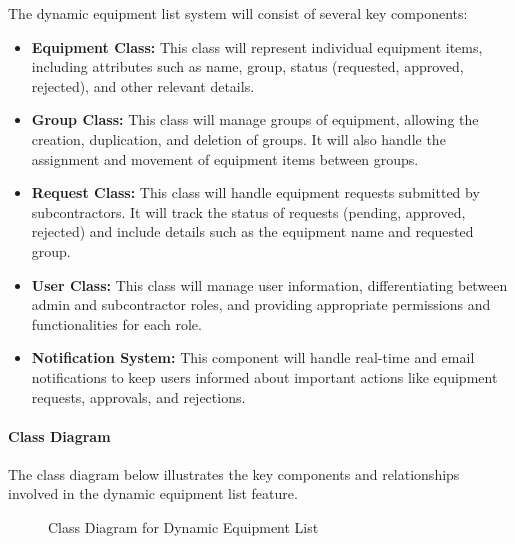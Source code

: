 The dynamic equipment list system will consist of several key components:

\begin{itemize}
    \item \textbf{Equipment Class:} This class will represent individual equipment items, including attributes such as name, group, status (requested, approved, rejected), and other relevant details.
    \item \textbf{Group Class:} This class will manage groups of equipment, allowing the creation, duplication, and deletion of groups. It will also handle the assignment and movement of equipment items between groups.
    \item \textbf{Request Class:} This class will handle equipment requests submitted by subcontractors. It will track the status of requests (pending, approved, rejected) and include details such as the equipment name and requested group.
    \item \textbf{User Class:} This class will manage user information, differentiating between admin and subcontractor roles, and providing appropriate permissions and functionalities for each role.
    \item \textbf{Notification System:} This component will handle real-time and email notifications to keep users informed about important actions like equipment requests, approvals, and rejections.
\end{itemize}
\paragraph{Class Diagram}
The class diagram below illustrates the key components and relationships involved in the dynamic equipment list feature.

\begin{figure}[H]
    \centering
    \caption{Class Diagram for Dynamic Equipment List}
    \label{fig:class_diagram}
\end{figure}



